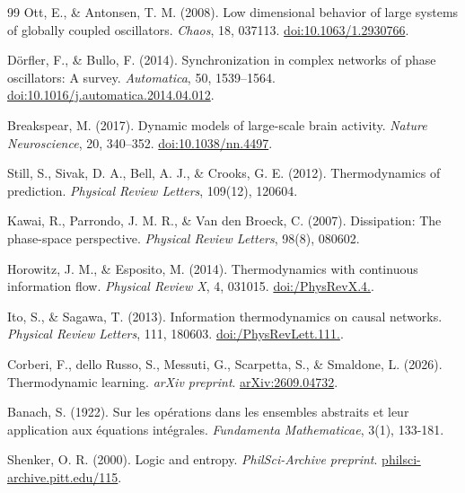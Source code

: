 \begin{thebibliography}{99}
 Ott, E., \& Antonsen, T. M. (2008). Low dimensional behavior of large systems of globally coupled oscillators. \textit{Chaos}, 18, 037113. \href{https://doi.org/10.1063/1.2930766}{doi:10.1063/1.2930766}.

 D\"orfler, F., \& Bullo, F. (2014). Synchronization in complex networks of phase oscillators: A survey. \textit{Automatica}, 50, 1539--1564. \href{https://doi.org/10.1016/j.automatica.2014.04.012}{doi:10.1016/j.automatica.2014.04.012}.

 Breakspear, M. (2017). Dynamic models of large-scale brain activity. \textit{Nature Neuroscience}, 20, 340--352. \href{https://doi.org/10.1038/nn.4497}{doi:10.1038/nn.4497}.

 Still, S., Sivak, D. A., Bell, A. J., \& Crooks, G. E. (2012). Thermodynamics of prediction. \textit{Physical Review Letters}, 109(12), 120604.

 Kawai, R., Parrondo, J. M. R., \& Van den Broeck, C. (2007). Dissipation: The phase-space perspective. \textit{Physical Review Letters}, 98(8), 080602.

 Horowitz, J. M., \& Esposito, M. (2014). Thermodynamics with continuous information flow. \textit{Physical Review X}, 4, 031015. \href{https://doi.org/10.1103/PhysRevX.4.031015}{doi:/\allowbreak PhysRevX.4.}.

 Ito, S., \& Sagawa, T. (2013). Information thermodynamics on causal networks. \textit{Physical Review Letters}, 111, 180603. \href{https://doi.org/10.1103/PhysRevLett.111.180603}{doi:/\allowbreak PhysRevLett.111.}.

 Corberi, F., dello Russo, S., Messuti, G., Scarpetta, S., \& Smaldone, L. (2026). Thermodynamic learning. \textit{arXiv preprint}. \href{https://arxiv.org/abs/2609.04732}{arXiv:2609.04732}.

 Banach, S. (1922). Sur les op\'{e}rations dans les ensembles abstraits et leur application aux \'{e}quations int\'{e}grales. \textit{Fundamenta Mathematicae}, 3(1), 133-181.

  Shenker, O. R. (2000). Logic and entropy. \textit{PhilSci-Archive preprint}. \href{https://philsci-archive.pitt.edu/115/}{philsci-archive.pitt.edu/115}.


\end{thebibliography}
